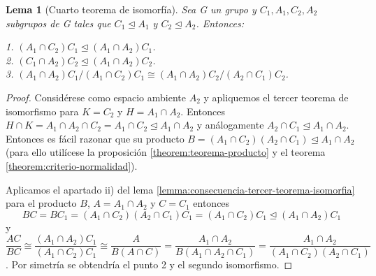 \documentclass{article}
\theoremstyle{theorem-style}  %
\newtheorem{lemma}[theorem]{Lema}
\theoremstyle{definition-style}
\theoremstyle{example-style}
\begin{document}
\begin{lemma}[Cuarto teorema de isomorfía]
Sea G un grupo y $C_1,A_1,C_2,A_2$ subgrupos de G tales que $C_1 \trianglelefteq A_1$ y $C_2 \trianglelefteq A_2$. Entonces:

1. $(A_1 \cap C_2)C_1 \trianglelefteq (A_1 \cap A_2)C_1$.\\
2. $(C_1 \cap A_2)C_2 \trianglelefteq (A_1 \cap A_2)C_2$.\\
3. $(A_1 \cap A_2)C_1/(A_1 \cap C_2)C_1 \cong (A_1 \cap A_2)C_2/(A_2 \cap C_1)C_2$.
\end{lemma}
\begin{proof}
Considérese como espacio ambiente $A_2$ y apliquemos el tercer teorema de isomorfismo para $K = C_2$ y $H = A_1 \cap A_2$. Entonces $H \cap K = A_1 \cap A_2 \cap C_2 = A_1 \cap C_2 \trianglelefteq A_1 \cap A_2$ y análogamente $A_2 \cap C_1 \trianglelefteq A_1 \cap A_2$. Entonces es fácil razonar que su producto $B = (A_1 \cap C_2)(A_2 \cap C_1) \trianglelefteq A_1 \cap A_2$ (para ello utilícese la proposición \ref{theorem:teorema-producto} y el teorema \ref{theorem:criterio-normalidad}). 

Aplicamos el apartado ii) del lema \ref{lemma:consecuencia-tercer-teorema-isomorfia} para el producto $B$, $A = A_1 \cap A_2$ y $C = C_1$ entonces $$BC = BC_1 = (A_1 \cap C_2)(A_2 \cap C_1)C_1 = (A_1 \cap C_2)C_1 \trianglelefteq (A_1 \cap A_2)C_1$$ y $$\frac{AC}{BC} \cong \frac{(A_1 \cap A_2)C_1}{(A_1 \cap C_2)C_1} \cong \frac{A}{B(A \cap C)} = \frac{A_1 \cap A_2}{B(A_1 \cap A_2 \cap C_1)} = \frac{A_1 \cap A_2}{(A_1 \cap C_2)(A_2 \cap C_1)}$$. Por simetría se obtendría el punto 2 y el segundo isomorfismo.
\end{proof}
\end{document}

